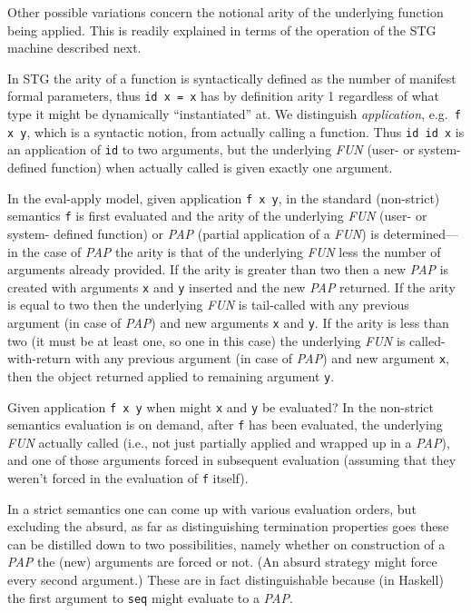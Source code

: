 \documentclass{llncs}
\begin{document}
Other possible variations concern the notional arity of the underlying
function being applied.  This is readily explained in terms of the operation of the
STG machine described next.

In STG the arity of a function is syntactically defined as the number of
manifest formal parameters, thus \texttt{id x = x} has by definition arity 1
regardless of what type it might be dynamically ``instantiated'' at.  We distinguish
\emph{application}, e.g.\ \texttt{f x y}, which is a syntactic notion, from
actually calling a function. Thus \texttt{id id x} is an application of \texttt{id}
to two arguments, but the underlying \emph{FUN} (user- or system- defined function)
when actually called is given exactly one argument.

In the eval-apply model, given application \texttt{f x y}, in the standard
(non-strict) semantics \texttt{f} is first evaluated and the arity of the
underlying \emph{FUN} (user- or system- defined function) or \emph{PAP}
(partial application of a \emph{FUN}) is determined---in the case of
\emph{PAP} the arity is that of the underlying \emph{FUN} less the number of
arguments already provided.  If the arity is greater than two then a new
\emph{PAP} is created with arguments \texttt{x} and \texttt{y} inserted and
the new \emph{PAP} returned.  If the arity is equal to two then the underlying
\emph{FUN} is tail-called with any previous argument (in case of \emph{PAP})
and new arguments \texttt{x} and \texttt{y}.  If the arity is less than two
(it must be at least one, so one in this case) the underlying \emph{FUN} is
called-with-return with any previous argument (in case of \emph{PAP}) and new
argument \texttt{x}, then the object returned applied to remaining argument
\texttt{y}.

Given application \texttt{f x y} when might \texttt{x} and \texttt{y} be
evaluated?  In the non-strict semantics evaluation is on demand, after
\texttt{f} has been evaluated, the underlying \emph{FUN} actually called
(i.e., not just partially applied and wrapped up in a \emph{PAP}), and one of
those arguments forced in subsequent evaluation (assuming that they weren't
forced in the evaluation of \texttt{f} itself).  

In a strict semantics one can come up with various evaluation orders, but
excluding the absurd, as far as distinguishing termination properties goes
these can be distilled down to two possibilities, namely whether on
construction of a \emph{PAP} the (new) arguments are forced or not.  (An
absurd strategy might force every second argument.)  These are in fact
distinguishable because (in Haskell) the first argument to \texttt{seq} might
evaluate to a \emph{PAP}.
\end{document}
